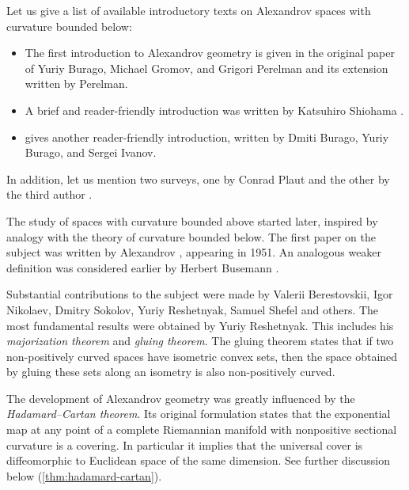 %
Let us give a list of available introductory texts on Alexandrov spaces with curvature bounded below: 
\begin{itemize}
\item The first introduction to Alexandrov geometry is given in the original paper of Yuriy Burago, Michael Gromov, and Grigori Perelman \cite{burago-gromov-perelman} 
and its extension \cite{perelman:spaces2} written by Perelman.
\item A brief and reader-friendly introduction was written by Katsuhiro Shiohama \cite[Sections 1--8]{shiohama}.
\item \cite[Chapter 10]{burago-burago-ivanov} gives another reader-friendly introduction, written by Dmiti Burago, Yuriy Burago, and Sergei Ivanov.
\end{itemize}
In addition, let us mention two surveys, one by Conrad Plaut \cite{plaut:survey} and the other by the third author \cite{petrunin:survey}.

The study of  spaces with curvature bounded above started later,
inspired by analogy with the theory of curvature bounded below.
The first paper on the subject was written by Alexandrov \cite{alexandrov:strong-angle}, appearing in 1951.
An analogous weaker definition was considered earlier by Herbert Busemann \cite{busemann-CBA}.

Substantial contributions to the subject were made by
Valerii Berestovskii, 
Igor Nikolaev,
Dmitry Sokolov,
Yuriy Reshetnyak,
Samuel Shefel and others.
The most fundamental results were obtained by Yuriy Reshetnyak.
This includes his {}\emph{majorization theorem} and {}\emph{gluing theorem}.
The gluing theorem states that if two non-positively curved spaces have isometric convex sets, then the space obtained by gluing these sets along an isometry is also non-positively curved.

The development of Alexandrov geometry was greatly influenced by the {}\emph{Hadamard--Cartan theorem}.
Its original formulation states that the exponential map at any point of a complete Riemannian manifold with nonpositive sectional curvature is a covering.
In particular it implies that the universal cover is diffeomorphic to Euclidean space of the same dimension. 
See further discussion below (\ref{thm:hadamard-cartan}).

